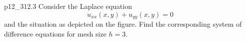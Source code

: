 
\begin{problemwithimage}{p12_3}{12.3}
  Consider the Laplace equation
  \begin{equation*}
    u_{x x}(x,y) + u_{yy}(x,y)=0
  \end{equation*}
  and the situation as depicted on the figure.
  Find the corresponding system of difference equations for mesh size $h = 3$.
\end{problemwithimage}


